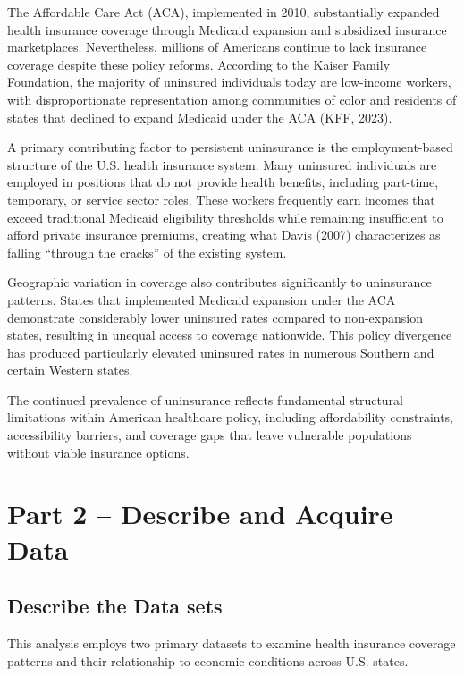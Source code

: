 \documentclass[
]{article}
\begin{document}
The Affordable Care Act (ACA), implemented in 2010, substantially
expanded health insurance coverage through Medicaid expansion and
subsidized insurance marketplaces. Nevertheless, millions of Americans
continue to lack insurance coverage despite these policy reforms.
According to the Kaiser Family Foundation, the majority of uninsured
individuals today are low-income workers, with disproportionate
representation among communities of color and residents of states that
declined to expand Medicaid under the ACA (KFF, 2023).

A primary contributing factor to persistent uninsurance is the
employment-based structure of the U.S. health insurance system. Many
uninsured individuals are employed in positions that do not provide
health benefits, including part-time, temporary, or service sector
roles. These workers frequently earn incomes that exceed traditional
Medicaid eligibility thresholds while remaining insufficient to afford
private insurance premiums, creating what Davis (2007) characterizes as
falling ``through the cracks'' of the existing system.

Geographic variation in coverage also contributes significantly to
uninsurance patterns. States that implemented Medicaid expansion under
the ACA demonstrate considerably lower uninsured rates compared to
non-expansion states, resulting in unequal access to coverage
nationwide. This policy divergence has produced particularly elevated
uninsured rates in numerous Southern and certain Western states.

The continued prevalence of uninsurance reflects fundamental structural
limitations within American healthcare policy, including affordability
constraints, accessibility barriers, and coverage gaps that leave
vulnerable populations without viable insurance options.

\section{Part 2 -- Describe and Acquire
Data}\label{part-2-describe-and-acquire-data}

\subsection{Describe the Data sets}\label{describe-the-data-sets}

This analysis employs two primary datasets to examine health insurance
coverage patterns and their relationship to economic conditions across
U.S. states.
\end{document}

